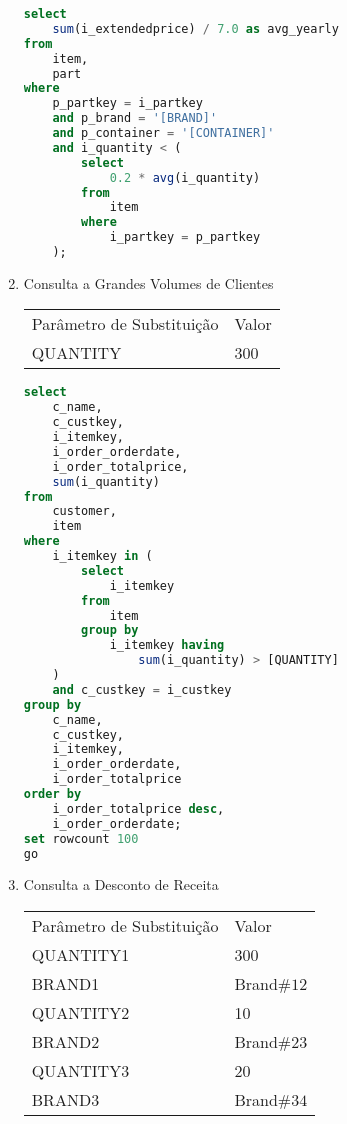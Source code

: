 \begin{enumerate}
	\begin{lstlisting}[language=SQL]
select
    sum(i_extendedprice) / 7.0 as avg_yearly
from
    item,
    part
where
    p_partkey = i_partkey
    and p_brand = '[BRAND]'
    and p_container = '[CONTAINER]'
    and i_quantity < (
        select
            0.2 * avg(i_quantity)
        from
            item
        where
            i_partkey = p_partkey
    );
	\end{lstlisting}

\item Consulta a Grandes Volumes de Clientes

\begin{tabular}{ll}
	Parâmetro de Substituição & Valor\\
	QUANTITY & 300\\
\end{tabular}

	\begin{lstlisting}[language=SQL]
select
    c_name,
    c_custkey,
    i_itemkey,
    i_order_orderdate,
    i_order_totalprice,
    sum(i_quantity)
from
    customer,
    item
where
    i_itemkey in (
        select
            i_itemkey
        from
            item
        group by
            i_itemkey having
                sum(i_quantity) > [QUANTITY]
    )
    and c_custkey = i_custkey
group by
    c_name,
    c_custkey,
    i_itemkey,
    i_order_orderdate,
    i_order_totalprice
order by
    i_order_totalprice desc,
    i_order_orderdate;
set rowcount 100
go
	\end{lstlisting}
	
\item Consulta a Desconto de Receita

\begin{tabular}{ll}
	Parâmetro de Substituição & Valor\\
	QUANTITY1 & 300\\
	BRAND1 & Brand$\#12$ \\
	QUANTITY2 & 10 \\
	BRAND2 & Brand$\#23$ \\
	QUANTITY3 & 20 \\
	BRAND3 & Brand$\#34$ \\
\end{tabular}


\end{enumerate}
